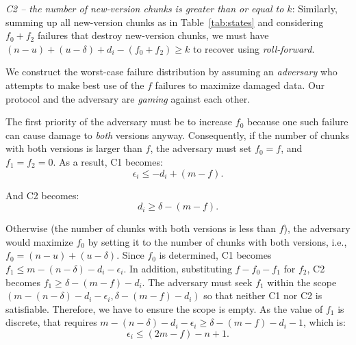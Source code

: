 \documentclass[letterpaper,10pt,twocolumn]{article}
\begin{document}
\emph{C2 -- the number of new-version chunks is greater than or equal to $k$}: Similarly, summing up all new-version
chunks as in Table~\ref{tab:states} and considering $f_0 + f_2$ failures that
destroy new-version chunks, we must have $(n - u) + (u - \delta) + d_i
- (f_0 + f_2) \ge k$ to recover using \emph{roll-forward}.

We construct the worst-case failure distribution by assuming an
\emph{adversary} who attempts to make best use of the $f$
failures to maximize damaged data.  Our protocol and the adversary are
\emph{gaming} against each other.

The first priority of the adversary must be to increase $f_0$ because one such
failure can cause damage to \emph{both} versions anyway.  Consequently, if the
number of chunks with both versions is larger than $f$, the adversary must set
$f_0 = f$, and $f_1 = f_2 = 0$. As a result, C1 becomes:
\begin{equation}
\epsilon_i \le -d_i + (m - f).
\label{eq:roll-back-constraint}
\end{equation}

And C2 becomes:
\begin{equation}
d_i \ge \delta - (m - f).
\label{eq:roll-forward-constraint}
\end{equation}

Otherwise (the number of chunks with both versions is less than
$f$), the adversary would maximize $f_0$ by setting it to the number
of chunks with both versions, i.e., $f_0 = (n - u) + (u - \delta)$.
Since $f_0$ is determined, C1 becomes $f_1 \le
m - (n - \delta) - d_i - \epsilon_i$. In addition, substituting $f - f_0 - f_1$
for $f_2$, C2 becomes $f_1 \ge \delta - (m - f) - d_i$.
The adversary must seek $f_1$ within the scope $(m - (n - \delta) - d_i -
\epsilon_i, \delta - (m - f) - d_i)$ so that neither C1 nor C2 is satisfiable.
Therefore, we have to ensure the scope is empty.  As the value of $f_1$ is
discrete, that requires $m - (n - \delta) - d_i - \epsilon_i \ge \delta - (m -
f) - d_i - 1$, which is:
\begin{equation}
\epsilon_i \le (2m - f) - n + 1.
\label{eq:discretionary}
\end{equation}
\end{document}
